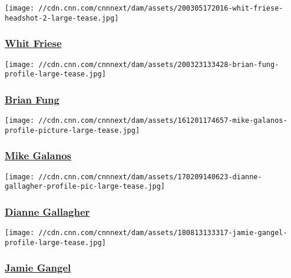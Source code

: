 \href{/profiles/whit-friese}{}

\texttt{[image: //cdn.cnn.com/cnnnext/dam/assets/200305172016-whit-friese-headshot-2-large-tease.jpg]}

\hypertarget{whit-friese}{%
\subsubsection{\texorpdfstring{\href{/profiles/whit-friese}{Whit
Friese}}{Whit Friese}}\label{whit-friese}}

\href{/profiles/brian-fung}{}

\texttt{[image: //cdn.cnn.com/cnnnext/dam/assets/200323133428-brian-fung-profile-large-tease.jpg]}

\hypertarget{brian-fung-}{%
\subsubsection{\texorpdfstring{\href{/profiles/brian-fung}{Brian Fung
}}{Brian Fung }}\label{brian-fung-}}

\href{/profiles/mike-galanos}{}

\texttt{[image: //cdn.cnn.com/cnnnext/dam/assets/161201174657-mike-galanos-profile-picture-large-tease.jpg]}

\hypertarget{mike-galanos}{%
\subsubsection{\texorpdfstring{\href{/profiles/mike-galanos}{Mike
Galanos}}{Mike Galanos}}\label{mike-galanos}}

\href{/profiles/dianne-gallagher-profile}{}

\texttt{[image: //cdn.cnn.com/cnnnext/dam/assets/170209140623-dianne-gallagher-profile-pic-large-tease.jpg]}

\hypertarget{dianne-gallagher}{%
\subsubsection{\texorpdfstring{\href{/profiles/dianne-gallagher-profile}{Dianne
Gallagher}}{Dianne Gallagher}}\label{dianne-gallagher}}

\href{/profiles/jamie-gangel-profile}{}

\texttt{[image: //cdn.cnn.com/cnnnext/dam/assets/180813133317-jamie-gangel-profile-large-tease.jpg]}

\hypertarget{jamie-gangel}{%
\subsubsection{\texorpdfstring{\href{/profiles/jamie-gangel-profile}{Jamie
Gangel}}{Jamie Gangel}}\label{jamie-gangel}}

